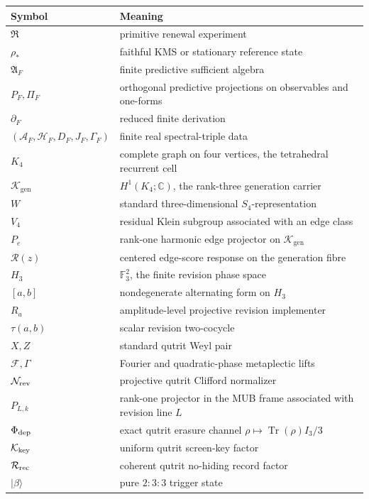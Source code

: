 \documentclass[11pt,oneside,openany]{book}
\numberwithin{equation}{chapter}
\theoremstyle{definition}
\theoremstyle{remark}
\newcommand{\C}{\mathbb C}
\newcommand{\Tr}{\operatorname{Tr}}
\newcommand{\AF}{\mathcal A_F}
\newcommand{\HF}{\mathcal H_F}
\newcommand{\DF}{D_F}
\newcommand{\JF}{J_F}
\newcommand{\GF}{\Gamma_F}
\newcommand{\Kgen}{\mathcal K_{\mathrm{gen}}}
\begin{document}
\begin{longtable}{@{}p{}p{}@{}}
\toprule
Symbol & Meaning\\
\midrule
\(\mathfrak R\) & primitive renewal experiment\\
\(\rho_*\) & faithful KMS or stationary reference state\\
\(\mathfrak A_F\) & finite predictive sufficient algebra\\
\(P_F,\Pi_F\) & orthogonal predictive projections on observables and one-forms\\
\(\partial_F\) & reduced finite derivation\\
\((\AF,\HF,\DF,\JF,\GF)\) & finite real spectral-triple data\\
\(K_4\) & complete graph on four vertices, the tetrahedral recurrent cell\\
\(\Kgen\) & \(H^1(K_4;\C)\), the rank-three generation carrier\\
\(W\) & standard three-dimensional \(S_4\)-representation\\
\(V_4\) & residual Klein subgroup associated with an edge class\\
\(P_e\) & rank-one harmonic edge projector on \(\Kgen\)\\
\(\mathscr R(z)\) & centered edge-score response on the generation fibre\\
\(H_3\) & \(\mathbb F_3^2\), the finite revision phase space\\
\([a,b]\) & nondegenerate alternating form on \(H_3\)\\
\(R_a\) & amplitude-level projective revision implementer\\
\(\tau(a,b)\) & scalar revision two-cocycle\\
\(X,Z\) & standard qutrit Weyl pair\\
\(\mathcal F,\Gamma\) & Fourier and quadratic-phase metaplectic lifts\\
\(\mathcal N_{\rm rev}\) & projective qutrit Clifford normalizer\\
\(P_{L,k}\) & rank-one projector in the MUB frame associated with revision line \(L\)\\
\(\Phi_{\rm dep}\) & exact qutrit erasure channel
\(\rho\mapsto\Tr(\rho)I_3/3\)\\
\(\mathcal K_{\rm key}\) & uniform qutrit screen-key factor\\
\(\mathcal R_{\rm rec}\) & coherent qutrit no-hiding record factor\\
\(|\beta\rangle\) & pure \(2{:}3{:}3\) trigger state\\

\end{longtable}
\end{document}
